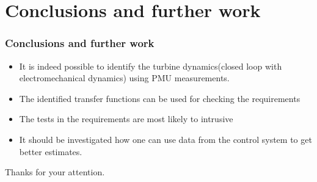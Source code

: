 \section{Conclusions and further work}
\begin{frame}
		\frametitle{Conclusions and further work}
	\begin{itemize}
		\item It is indeed possible to identify the turbine dynamics(closed loop with electromechanical dynamics) using PMU measurements.
		\item The identified transfer functions can be used for checking the requirements
		\item The tests in the requirements are most likely to intrusive
		\item It should be investigated how one can use data from the control system to get better estimates.
	\end{itemize}
\end{frame}
\begin{frame}
		\begin{center}
		\Huge	Thanks for your attention.
\end{center}
\end{frame}
